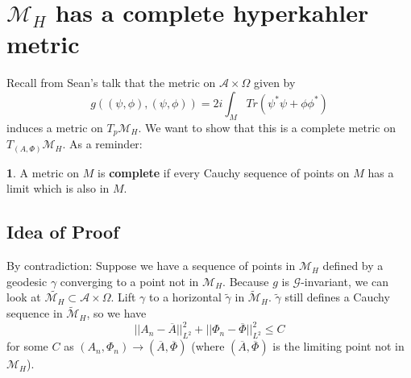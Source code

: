 \documentclass[oneside,english]{amsbook}
\numberwithin{section}{chapter}
\numberwithin{equation}{section}
\numberwithin{figure}{section}
\theoremstyle{plain}
\theoremstyle{definition}
\theoremstyle{remark}
\theoremstyle{definition}
\theoremstyle{definition}
\newtheorem*{defn*}{\protect\definitionname}
\theoremstyle{plain}
\providecommand{\definitionname}{Definition}
\begin{document}
\section{$\mathcal{M}_{H}$ has a complete hyperkahler metric}

Recall from Sean's talk that the metric on $\mathcal{A}\times\Omega$
given by
\[
g\left((\psi,\phi),\left(\psi,\phi\right)\right)=2i\int_{M}Tr\left(\psi^{*}\psi+\phi\phi^{*}\right)
\]
induces a metric on $T_{p}\mathcal{M}_{H}$. We want to show that
this is a complete metric on $T_{\left(A,\Phi\right)}\mathcal{M}_{H}$.
As a reminder:
\begin{defn*}
A metric on $M$ is \textbf{complete} if every Cauchy sequence of
points on $M$ has a limit which is also in $M$.
\end{defn*}

\subsection{Idea of Proof}

By contradiction: Suppose we have a sequence of points in $\mathcal{M}_{H}$
defined by a geodesic $\gamma$ converging to a point not in $\mathcal{M}_{H}$.
Because $g$ is $\mathcal{G}$-invariant, we can look at $\tilde{\mathcal{M}_{H}}\subset\mathcal{A}\times\Omega$.
Lift $\gamma$ to a horizontal $\tilde{\gamma}$ in $\tilde{\mathcal{M}}_{H}$.
$\tilde{\gamma}$ still defines a Cauchy sequence in $\tilde{\mathcal{M}}_{H}$,
so we have
\[
||A_{n}-\overline{A}||_{L^{2}}^{2}+||\Phi_{n}-\overline{\Phi}||_{L^{2}}^{2}\leq C
\]
 for some $C$ as $\left(A_{n},\Phi_{n}\right)\rightarrow\left(\overline{A},\overline{\Phi}\right)$
(where $\left(\overline{A},\overline{\Phi}\right)$ is the limiting
point not in $\mathcal{M}_{H}$).
\end{document}
